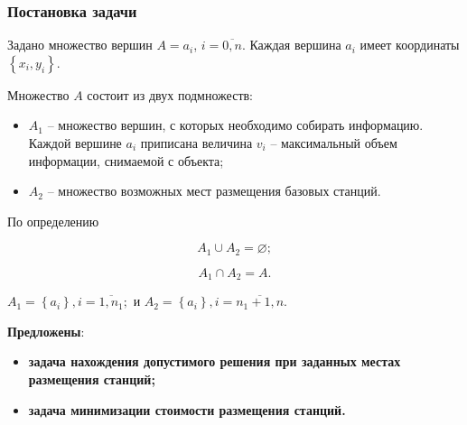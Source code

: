 \begin{frame}
    \frametitle{Постановка задачи}
    \fontsize{8pt}{7.2}\selectfont
    \justifying
    Задано множество вершин $A = a_i$, $i=\overline{0,n}$. Каждая вершина $a_i$ имеет координаты $\left\{ x_i, y_i \right\}$.
    
    \begin{minipage}[c]{0.47\linewidth}
        \fontsize{8pt}{7.2}\selectfont

        Множество $A$ состоит из двух подмножеств: 
        \begin{itemize}
        \item $A_1$ -- множество вершин, с которых необходимо собирать информацию. Каждой вершине $a_i$ приписана   величина $v_i$ -- максимальный объем информации, снимаемой с объекта;
        \item $A_2$ -- множество возможных мест размещения базовых станций. 
        \end{itemize}

        По определению

        $$
        A_1 \cup A_2 = \varnothing;
        $$

        $$
        A_1 \cap A_2 = A.
        $$

        
    \end{minipage}
    \begin{minipage}[c]{0.47\linewidth}
    \end{minipage}
    

    $
    A_1 = \left\{a_i \right\}, i= \overline{1,n_1};
    $ и $
    A_2 = \left\{ a_i  \right\}, i= \overline{n_1+1,n}.
    $

    \textbf{Предложены}:
    \begin{itemize}
        \item \textbf{задача нахождения допустимого решения при заданных местах размещения станций;}
        \item \textbf{задача минимизации стоимости размещения станций.}
    \end{itemize}
    
\end{frame}

